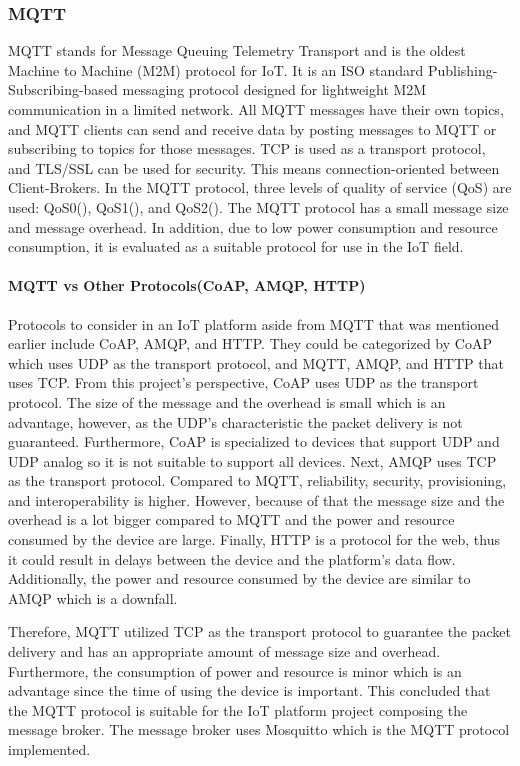 \documentclass[conference]{IEEEtran}
\begin{document}
\subsubsection{MQTT}
MQTT stands for Message Queuing Telemetry Transport and is the oldest Machine to Machine (M2M) protocol for IoT. It is an ISO standard Publishing-Subscribing-based messaging protocol designed for lightweight M2M communication in a limited network. All MQTT messages have their own topics, and MQTT clients can send and receive data by posting messages to MQTT  or subscribing to topics for those messages. TCP is used as a transport protocol, and TLS/SSL can be used for security. This means connection-oriented between Client-Brokers. In the MQTT protocol, three levels of quality of service (QoS) are used: QoS0(), QoS1(), and QoS2(). The MQTT protocol has a small message size and message overhead. In addition, due to low power consumption and resource consumption, it is evaluated as a suitable protocol for use in the IoT field.
\cite{b21}

\paragraph{MQTT vs Other Protocols(CoAP, AMQP, HTTP)}
\hfill \break
Protocols to consider in an IoT platform aside from MQTT that was mentioned earlier include
CoAP, AMQP, and HTTP. They could be categorized by CoAP which uses UDP as the transport protocol, and MQTT, AMQP, and HTTP that uses TCP. From this project’s perspective, CoAP uses UDP as the transport protocol. The size of the message and the overhead is small which is an advantage, however, as the UDP’s characteristic the packet delivery is not guaranteed. Furthermore, CoAP is specialized to devices that support UDP and UDP analog so it is not suitable to support all devices. Next, AMQP uses TCP as the transport protocol. Compared to MQTT, reliability, security, provisioning, and interoperability is higher. However, because of that the message size and the overhead is a lot bigger compared to MQTT and the power and resource consumed by the device are large. Finally, HTTP is a protocol for the web, thus it could result in delays between the device and the platform’s data flow. Additionally, the power and resource consumed by the device are similar to AMQP which is a downfall.

Therefore, MQTT utilized TCP as the transport protocol to guarantee the packet delivery and has an appropriate amount of message size and overhead. Furthermore, the consumption of power and resource is minor which is an advantage since the time of using the device is important.
This concluded that the MQTT protocol is suitable for the IoT platform project composing the
message broker. The message broker uses Mosquitto which is the MQTT protocol implemented.\cite{b21} 
\end{document}
